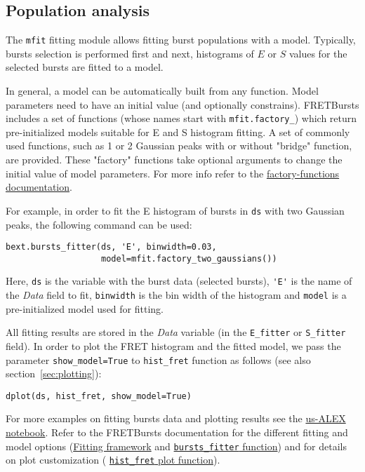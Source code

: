 \subsection{Population analysis}
\label{sec:fretfit}

The \verb|mfit| fitting module allows fitting burst populations with a model.
Typically, bursts selection is performed first and next, histograms of
$E$ or $S$ values for the selected bursts are fitted to a model.

In general, a model can be automatically built from any function.
Model parameters need to have an initial value (and optionally
constrains). FRETBursts includes a set of functions (whose names start with
\verb|mfit.factory_|) which return pre-initialized models suitable for E and S
histogram fitting. A set of commonly used functions, such as 1 or 2 Gaussian
peaks with or without "bridge" function, are provided. These "factory" functions
take optional arguments to change the initial value of model parameters.
For more info refer to the
\href{http://fretbursts.readthedocs.org/en/latest/mfit.html#model-factory-functions}{factory-functions documentation}.

For example, in order to fit the E histogram of bursts in \verb|ds| with two
Gaussian peaks, the following command can be used:

\begin{verbatim}
bext.bursts_fitter(ds, 'E', binwidth=0.03,
                   model=mfit.factory_two_gaussians())
\end{verbatim}

Here, \verb|ds| is the variable with the burst data (selected bursts),
\verb|'E'| is the name of the \textit{Data} field to fit, \verb|binwidth| is the bin
width of the histogram and \verb|model| is a pre-initialized model used for
fitting.

All fitting results are stored in the \textit{Data} variable (in the \verb|E_fitter| or
\verb|S_fitter| field).
In order to plot the FRET histogram and the fitted model, we pass the parameter
\verb|show_model=True| to \verb|hist_fret| function as follows
(see also section~\ref{sec:plotting}):

\begin{verbatim}
dplot(ds, hist_fret, show_model=True)
\end{verbatim}

For more examples on fitting bursts data and plotting results see the
\href{http://nbviewer.ipython.org/urls/raw.github.com/tritemio/FRETBursts_notebooks/master/notebooks/FRETBursts\%2520-\%2520us-ALEX\%2520smFRET\%2520burst\%2520analysis.ipynb}{us-ALEX notebook}.
Refer to the FRETBursts documentation for the different fitting and model options
(\href{http://fretbursts.readthedocs.org/en/latest/fit.html}{Fitting framework} and
\href{http://fretbursts.readthedocs.org/en/latest/plugins.html#fretbursts.burstlib\_ext.bursts\_fitter}{\texttt{bursts\_fitter} function})
and for details on plot customization (
\href{http://fretbursts.readthedocs.org/en/latest/plots.html#fretbursts.burst_plot.hist_fret}{\texttt{hist\_fret} plot function}).

